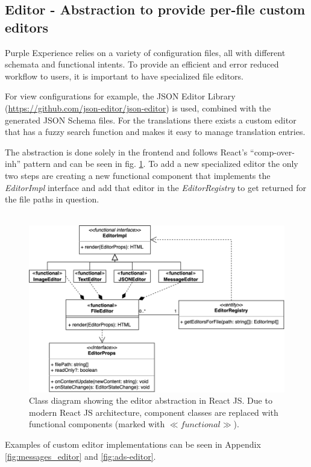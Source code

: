 \subsection{Editor - Abstraction to provide per-file custom editors}

Purple Experience relies on a variety of configuration files, all with different schemata and functional intents.
To provide an efficient and error reduced workflow to users, it is important to have specialized file editors.

For view configurations for example, the JSON Editor Library (\url{https://github.com/json-editor/json-editor}) is used, combined with the generated JSON Schema files. For the translations there exists a custom editor that has a fuzzy search function and makes it easy to manage translation entries.

The abstraction is done solely in the frontend and follows React's ``\Gls{comp-over-inh}'' pattern and can be seen in fig. \ref{fig:abstract-editor}.
To add a new specialized editor the only two steps are creating a new functional component that implements the \textit{EditorImpl} interface
and add that editor in the \textit{EditorRegistry} to get returned for the file paths in question.
\\\\
\begin{figure}[h!]
  \includegraphics[width=\textwidth]{pics/abstract_editor_uml.drawio.png}
  \caption{Class diagram showing the editor abstraction in React JS. Due to modern React JS architecture, component classes are replaced with functional components (marked with $\ll functional\gg$).}
  \label{fig:abstract-editor}
\end{figure}
Examples of custom editor implementations can be seen in Appendix \ref{fig:messages_editor} and \ref{fig:ads-editor}.


